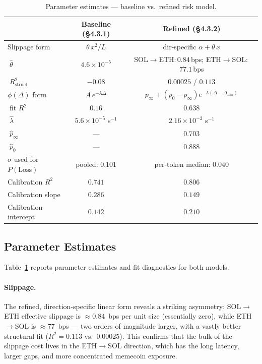 \documentclass[sigconf,nonacm,10pt]{acmart}
\newcommand{\SolEth}{SOL$\to$ETH}
\newcommand{\EthSol}{ETH$\to$SOL}
\begin{document}
\begin{table}[t]
    \centering
    \small
    \caption{Parameter estimates --- baseline vs.\ refined risk model.}
    \label{tab:ch4-validation}
    \begin{tabular}{lcc}
        \toprule
        & Baseline (§4.3.1) & Refined (§4.3.2) \\
        \midrule
        Slippage form & $\theta\,x^{2}/L$ & dir-specific $\alpha + \theta\,x$ \\
        $\;\hat\theta$ & $4.6\!\times\!10^{-5}$ & \SolEth:\,$0.84$\,bps; \EthSol:\,$77.1$\,bps \\
        $\;R^{2}_{\text{struct}}$ & $-0.08$ & $0.00025$ / $0.113$ \\
        \addlinespace
        $\phi(\Delta)$ form & $A\,e^{-\lambda\Delta}$ & $p_{\infty}+(p_{0}-p_{\infty})e^{-\lambda(\Delta-\Delta_{\min})}$ \\
        $\;$fit $R^{2}$ & $0.16$ & $\mathbf{0.638}$ \\
        $\;\hat\lambda$ & $5.6\!\times\!10^{-5}$ s$^{-1}$ & $2.16\!\times\!10^{-2}$ s$^{-1}$ \\
        $\;\hat p_{\infty}$ & --- & $0.703$ \\
        $\;\hat p_{0}$ & --- & $0.888$ \\
        \addlinespace
        $\sigma$ used for $P(\text{Loss})$ & pooled: $0.101$ & per-token median: $0.040$ \\
        Calibration $R^{2}$ & $0.741$ & $\mathbf{0.806}$ \\
        Calibration slope & $0.286$ & $0.149$ \\
        Calibration intercept & $0.142$ & $0.210$ \\
        \bottomrule
    \end{tabular}
\end{table}

\subsection{Parameter Estimates}

Table~\ref{tab:ch4-validation} reports parameter estimates and fit
diagnostics for both models.

\paragraph{Slippage.} The refined, direction-specific linear form reveals
a striking asymmetry: \SolEth{} effective slippage is $\approx\!0.84$~bps
per unit size (essentially zero), while \EthSol{} is $\approx\!77$~bps ---
two orders of magnitude larger, with a vastly better structural fit
($R^{2}\!=\!0.113$ vs.\ $0.00025$). This confirms that the bulk of the
slippage cost lives in the \EthSol{} direction, which has the long
latency, larger gaps, and more concentrated memecoin exposure.
\end{document}
